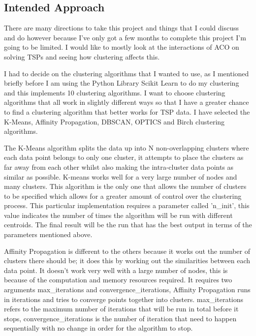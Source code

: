\subsection{Intended Approach}
There are many directions to take this project and things that I could discuss and do however because I've only got a few months to complete this project I'm going to be limited. I would like to mostly look at the interactions of ACO on solving TSPs and seeing how clustering affects this.

I had to decide on the clustering algorithms that I wanted to use, as I mentioned briefly before I am using the Python Library Scikit Learn to do my clustering and this implements 10 clustering algorithms. I want to choose clustering algorithms that all work in slightly different ways so that I have a greater chance to find a clustering algorithm that better works for TSP data. I have selected the K-Means, Affinity Propagation, DBSCAN, OPTICS and Birch clustering algorithms. 

The K-Means algorithm splits the data up into N non-overlapping clusters where each data point belongs to only one cluster, it attempts to place the clusters as far away from each other whilst also making the intra-cluster data points as similar as possible. K-means works well for a very large number of nodes and many clusters. This algorithm is the only one that allows the number of clusters to be specified which allows for a greater amount of control over the clustering process. This particular implementation requires a parameter called 'n\_init', this value indicates the number of times the algorithm will be run with different centroids. The final result will be the run that has the best output in terms of the parameters mentioned above.

Affinity Propagation is different to the others because it works out the number of clusters there should be; it does this by working out the similarities between each data point. It doesn't work very well with a large number of nodes, this is because of the computation and memory resources required. It requires two arguments max\_iterations and convergence\_iterations, Affinity Propagation runs in iterations and tries to converge points together into clusters. max\_iterations refers to the maximum number of iterations that will be run in total before it stops, convergence\_iterations is the number of iteration that need to happen sequentially with no change in order for the algorithm to stop. 

